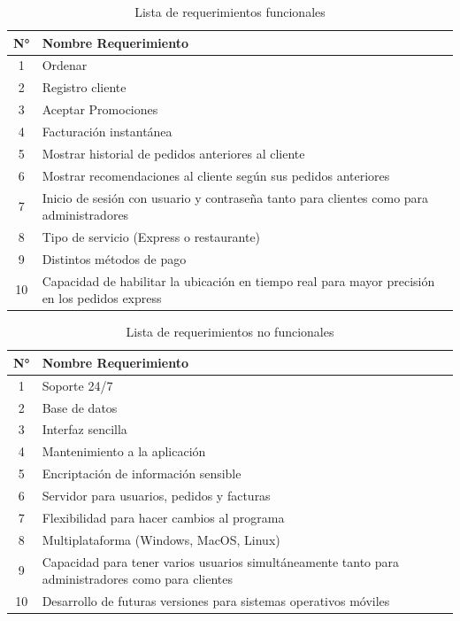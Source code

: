 \documentclass[conference]{IEEEtran}
\begin{document}
\begin{table}[H]
	\centering
	\caption{Lista de requerimientos funcionales}
\begin{adjustbox}{width=0.45\textwidth}

\begin{tabular}{|c|l|}
\hline 
N° & Nombre Requerimiento \\ 
\hline 
1 & Ordenar \\ 
\hline 
2 & Registro cliente \\ 
\hline 
3 & Aceptar Promociones \\ 
\hline 
4 & Facturación instantánea \\ 
\hline 
5 & Mostrar historial de pedidos anteriores al cliente \\ 
\hline 
6 & Mostrar recomendaciones al cliente según sus pedidos anteriores \\ 
\hline 
7 & Inicio de sesión con usuario y contraseña tanto para clientes como para administradores \\ 
\hline 
8 & Tipo de servicio (Express o restaurante) \\ 
\hline 
9 & Distintos métodos de pago \\ 
\hline 
10 & Capacidad de habilitar la ubicación en tiempo real para mayor precisión en los pedidos express \\ 
\hline

\end{tabular}
\end{adjustbox}
\end{table}%


\begin{table}[H]
	\centering
	\caption{Lista de requerimientos no funcionales}
\begin{adjustbox}{width=0.45\textwidth}

\begin{tabular}{|c|l|}
\hline 
N° & Nombre Requerimiento \\ 
\hline 
1 & Soporte 24/7 \\ 
\hline 
2 & Base de datos \\ 
\hline 
3 & Interfaz sencilla \\ 
\hline 
4 & Mantenimiento a la aplicación \\ 
\hline 
5 & Encriptación de información sensible \\ 
\hline 
6 & Servidor para usuarios, pedidos y facturas \\ 
\hline 
7 & Flexibilidad para hacer cambios al programa \\ 
\hline 
8 & Multiplataforma (Windows, MacOS, Linux) \\ 
\hline 
9 & Capacidad para tener varios usuarios simultáneamente 		tanto para administradores como para clientes \\ 
\hline 
10 & Desarrollo de futuras versiones para sistemas operativos móviles \\ 
\hline

\end{tabular}
\end{adjustbox}
\end{table}%
\end{document}
